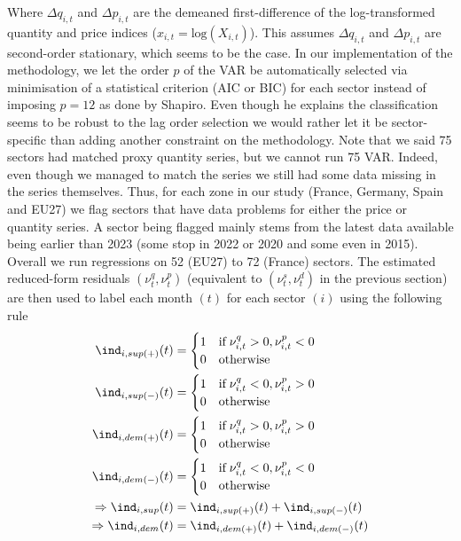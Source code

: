 Where $\Delta q_{i,t}$ and $\Delta p_{i,t}$ are the demeaned first-difference of the log-transformed quantity and price indices ($x_{i,t} = \textrm{log}(X_{i,t})$).
This assumes $\Delta q_{i,t}$ and $\Delta p_{i,t}$ are second-order stationary, which seems to be the case. 
\bigbreak
In our implementation of the methodology, we let the order $p$ of the VAR be automatically selected via minimisation of a statistical criterion (AIC or BIC) for each sector instead of imposing $p=12$ as done by Shapiro.
Even though he explains the classification seems to be robust to the lag order selection we would rather let it be sector-specific than adding another constraint on the methodology.
\bigbreak
Note that we said 75 sectors had matched proxy quantity series, but we cannot run 75 VAR. Indeed, even though we managed to match the series we still had some data missing in the series themselves.
Thus, for each zone in our study (France, Germany, Spain and EU27) we flag sectors that have data problems for either the price or quantity series. A sector being flagged mainly stems from the latest data available being earlier than 2023 (some stop in 2022 or 2020 and some even in 2015).
Overall we run regressions on 52 (EU27) to 72 (France) sectors.
\bigbreak
The estimated reduced-form residuals $(\nu_{t}^{q},\nu_{t}^{p})$ (equivalent to $(\nu_{t}^{s},\nu_{t}^{d})$ in the previous section) are then used to label each month $(t)$ for each sector $(i)$ using the following rule
\begin{align}
    \ind_{i,sup(+)}(t) &= \begin{cases} 1 \quad \textrm{if} \; \nu_{i,t}^{q}>0,\nu_{i,t}^{p}<0 \\ 0 \quad \textrm{otherwise} \end{cases} \nonumber\\
    \ind_{i,sup(-)}(t) &= \begin{cases} 1 \quad \textrm{if} \; \nu_{i,t}^{q}<0,\nu_{i,t}^{p}>0 \\ 0 \quad \textrm{otherwise} \end{cases} \nonumber\\
    \ind_{i,dem(+)}(t) &= \begin{cases} 1 \quad \textrm{if} \; \nu_{i,t}^{q}>0,\nu_{i,t}^{p}>0 \\ 0 \quad \textrm{otherwise} \end{cases} \nonumber\\
    \ind_{i,dem(-)}(t) &= \begin{cases} 1 \quad \textrm{if} \; \nu_{i,t}^{q}<0,\nu_{i,t}^{p}<0 \\ 0 \quad \textrm{otherwise} \end{cases} \nonumber\\
    \Rightarrow \ind_{i,sup}(t) &= \ind_{i,sup(+)}(t) + \ind_{i,sup(-)}(t) \label{shapiro_sup}\\ 
    \Rightarrow \ind_{i,dem}(t) &= \ind_{i,dem(+)}(t) + \ind_{i,dem(-)}(t) \label{shapiro_dem}\\ \nonumber
\end{align}

